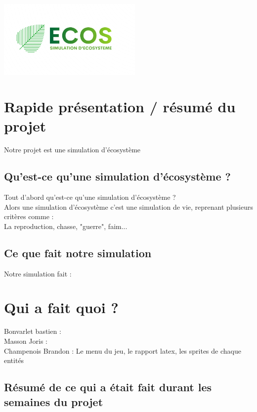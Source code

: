 \documentclass[a4paper, 11pt]{article}
\title{}
\author{CHAMPENOIS Brandon \textsc{G5B} \\ BONVARLET Bastien \textsc{G5B} \\ MASSON Joris \textsc{G5B} }
\begin{document}
\maketitle
\centerline{\includegraphics[width = 7cm]{images/ecos.png}}
\tableofcontents
\newpage

\section{Rapide présentation / résumé du projet}
Notre projet est une simulation d'écosystème\\

\subsection*{Qu'est-ce qu'une simulation d'écosystème ?}
Tout d'abord qu'est-ce qu'une simulation d'écosystème ?\\
Alors une simulation d'écosystème c'est une simulation de vie, reprenant plusieurs critères comme :\\
La reproduction, chasse, "guerre", faim...\\

\subsection{Ce que fait notre simulation}
Notre simulation fait :\\
\newpage

\section{Qui a fait quoi ?}

Bonvarlet bastien :\\
Masson Joris : \\
Champenois Brandon : Le menu du jeu, le rapport latex, les sprites de chaque entités

\subsection{Résumé de ce qui a était fait durant les semaines du projet}
\end{document}
